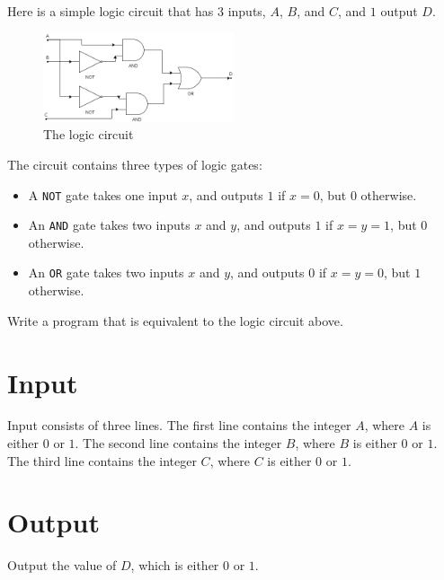 
Here is a simple logic circuit that has $3$ inputs, $A$, $B$, and $C$, and $1$ output $D$.

\begin{figure}[ht!]
  \centering
    \includegraphics[width=0.5\textwidth]{circuit}
  \caption{The logic circuit}
\end{figure}

The circuit contains three types of logic gates:

\begin{itemize}
    \item A \texttt{NOT} gate takes one input $x$, and outputs $1$ if $x=0$, but $0$ otherwise.
    \item An \texttt{AND} gate takes two inputs $x$ and $y$, and outputs $1$ if $x=y=1$, but $0$ otherwise.
    \item An \texttt{OR} gate takes two inputs $x$ and $y$, and outputs $0$ if $x=y=0$, but $1$ otherwise.
\end{itemize}

Write a program that is equivalent to the logic circuit above.

\section*{Input}
Input consists of three lines.
The first line contains the integer $A$, where $A$ is either $0$ or $1$.
The second line contains the integer $B$, where $B$ is either $0$ or $1$.
The third line contains the integer $C$, where $C$ is either $0$ or $1$.

\section*{Output}
Output the value of $D$, which is either $0$ or $1$.
